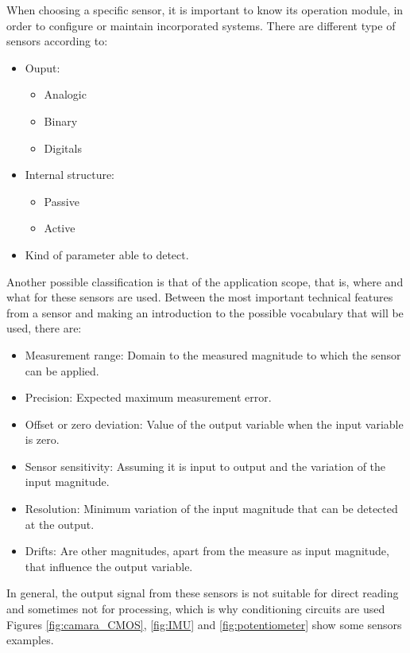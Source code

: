 When choosing a specific sensor, it is important to know its operation module, in order to configure or maintain incorporated systems. There are different type of sensors according to:

\begin{itemize}
	\item Ouput: \begin{itemize}
		\item Analogic
		\item Binary
		\item Digitals
	\end{itemize} 
	
	\item Internal structure: \begin{itemize}
		\item Passive
		\item Active
	\end{itemize}
	
	\item Kind of parameter able to detect.
\end{itemize}
 

Another possible classification is that of the application scope, that is, where and what for these sensors are used. \newline
Between the most important technical features from a sensor and making an introduction to the possible vocabulary that will be used, there are:

\begin{itemize}
	\item Measurement range: Domain to the measured magnitude to which the sensor can be applied.
	\item Precision: Expected maximum measurement error.
	\item Offset or zero deviation: Value of the output variable when the input variable is zero.
	\item Sensor sensitivity: Assuming it is input to output and the variation of the input magnitude.
	\item Resolution: Minimum variation of the input magnitude that can be detected at the output.
	\item Drifts: Are other magnitudes, apart from the measure as input magnitude, that influence the output variable.
\end{itemize}

In general, the output signal from these sensors is not suitable for direct reading and sometimes not for processing, which is why conditioning circuits are used Figures \ref{fig:camara_CMOS}, \ref{fig:IMU} and \ref{fig:potentiometer} show some sensors examples.

